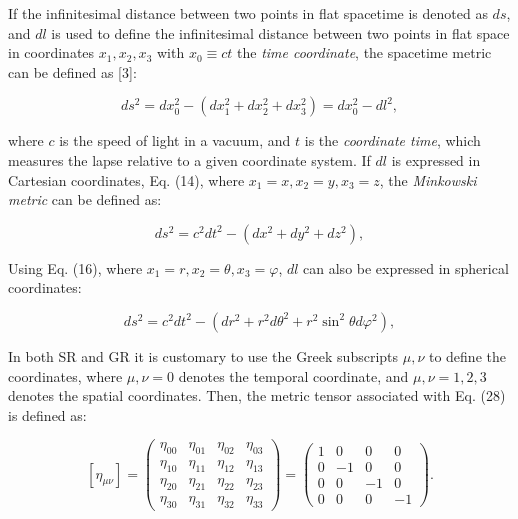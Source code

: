 \documentclass[11pt,letterpaper]{article}
\begin{document}
If the infinitesimal distance between two points in flat spacetime is denoted as $ds$, and $dl$ is used to define the infinitesimal distance between two points in flat space in coordinates $x_{1},x_{2},x_{3}$ with $x_{0} \equiv ct$ the \textit{time coordinate}, the spacetime metric can be defined as [3]:

\begin{equation}%
ds^{2} = dx_{0}^{2} - (dx_{1}^{2} + dx_{2}^{2} + dx_{3}^{2}) = dx_{0}^{2} -dl^{2},
\end{equation}

where $c$ is the speed of light in a vacuum, and $t$ is the \textit{coordinate time}, which measures the lapse relative to a given coordinate system. If $dl$ is expressed in Cartesian coordinates, Eq. (14), where $x_{1}=x,x_{2}=y,x_{3}=z$, the \textit{Minkowski metric} can be defined as:

\begin{equation}%
ds^{2} = c^{2}dt^{2} - (dx^{2} + dy^{2} + dz^{2}),
\end{equation}

Using Eq. (16), where $x_{1}=r,x_{2}=\theta,x_{3}=\varphi$, $dl$ can also be expressed in spherical coordinates:

\begin{equation}%
ds^{2} = c^{2}dt^{2} - (dr^{2} + r^{2}d\theta^{2} + r^{2}\sin^{2}\theta d\varphi^{2}),
\end{equation}

In both SR and GR it is customary to use the Greek subscripts $\mu,\nu$ to define the coordinates, where $\mu,\nu = 0$ denotes the temporal coordinate, and $\mu,\nu = 1,2,3$ denotes the spatial coordinates. Then, the metric tensor associated with Eq. (28) is defined as:

\begin{equation} %
\left[ \eta_{\mu \nu} \right] = \begin{pmatrix} \eta_{00} & \eta_{01} & \eta_{02} & \eta_{03} \\ \eta_{10} & \eta_{11} & \eta_{12} & \eta_{13} \\ \eta_{20} & \eta_{21} & \eta_{22} & \eta_{23} \\ \eta_{30} & \eta_{31} & \eta_{32} & \eta_{33} \end{pmatrix}= \begin{pmatrix} 1 & 0 & 0 & 0 \\ 0 & -1 & 0 & 0 \\0 & 0 & -1 & 0 \\ 0 & 0 & 0 & -1 \end{pmatrix}.
\end{equation}
\end{document}
